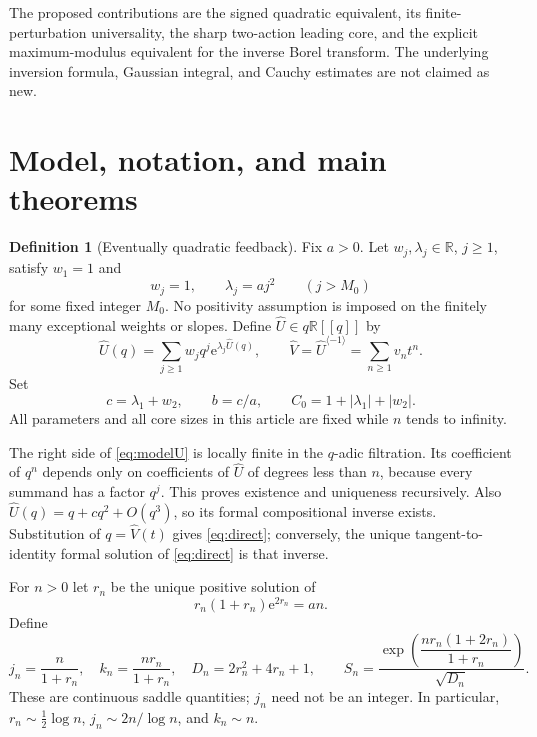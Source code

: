 \documentclass[11pt,a4paper]{article}
\numberwithin{equation}{section}
\theoremstyle{definition}
\newtheorem{definition}[theorem]{Definition}
\theoremstyle{remark}\newtheorem{remark}[theorem]{Remark}
\newcommand{\R}{\mathbb R}\newcommand{\C}{\mathbb C}\newcommand{\N}{\mathbb N}
\newcommand{\ee}{\mathrm e}\newcommand{\dd}{\mathrm d}
\newcommand{\U}{\widehat U}\newcommand{\V}{\widehat V}
\begin{document}
The proposed contributions are the signed quadratic equivalent, its
finite-perturbation universality, the sharp two-action leading core, and the
explicit maximum-modulus equivalent for the inverse Borel transform. The
underlying inversion formula, Gaussian integral, and Cauchy estimates are
not claimed as new.

\section{Model, notation, and main theorems}
\label{sec:main}

\begin{definition}[Eventually quadratic feedback]
Fix $a>0$. Let $w_j,\lambda_j\in\R$, $j\ge1$, satisfy $w_1=1$ and
\begin{equation}
 w_j=1,\qquad \lambda_j=aj^2\qquad(j>M_0)
 \label{eq:model}
\end{equation}
for some fixed integer $M_0$. No positivity assumption is imposed on the
finitely many exceptional weights or slopes. Define $\U\in q\R[[q]]$ by
\begin{equation}
 \U(q)=\sum_{j\ge1}w_jq^j\ee^{\lambda_j\U(q)},
 \qquad \V=\U^{\langle-1\rangle}=\sum_{n\ge1}v_nt^n.
 \label{eq:modelU}
\end{equation}
Set
\begin{equation}
 c=\lambda_1+w_2,\qquad b=c/a,\qquad
 C_0=1+|\lambda_1|+|w_2|.
 \label{eq:cb}
\end{equation}
All parameters and all core sizes in this article are fixed while $n$ tends
to infinity.
\end{definition}

The right side of \eqref{eq:modelU} is locally finite in the $q$-adic
filtration. Its coefficient of $q^n$ depends only on coefficients of $\U$
of degrees less than $n$, because every summand has a factor $q^j$.
This proves existence and uniqueness recursively. Also
$\U(q)=q+cq^2+O(q^3)$, so its formal compositional inverse exists. Substitution
of $q=\V(t)$ gives \eqref{eq:direct}; conversely, the unique tangent-to-identity
formal solution of \eqref{eq:direct} is that inverse.

For $n>0$ let $r_n$ be the unique positive solution of
\begin{equation}
 r_n(1+r_n)\ee^{2r_n}=an.
 \label{eq:r}
\end{equation}
Define
\begin{equation}
 j_n=\frac{n}{1+r_n},\quad k_n=\frac{nr_n}{1+r_n},\quad
 D_n=2r_n^2+4r_n+1,
 \qquad
 S_n=\frac{\exp\!\left(\dfrac{nr_n(1+2r_n)}{1+r_n}\right)}{\sqrt{D_n}}.
 \label{eq:S}
\end{equation}
These are continuous saddle quantities; $j_n$ need not be an integer.
In particular,
$r_n\sim\tfrac12\log n$, $j_n\sim2n/\log n$, and
$k_n\sim n$.
\end{document}
